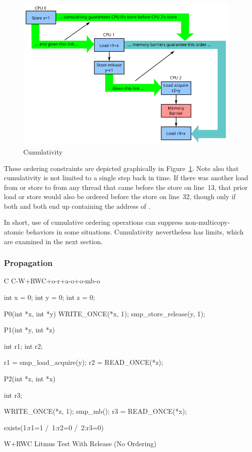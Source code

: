 \begin{figure}[htbp]
\centering
\includegraphics{memorder/memorybarriercum}
\caption{Cumulativity}
\label{fig:memorder:Cumulativity}
\end{figure}

These ordering constraints are depicted graphically in
Figure~\ref{fig:memorder:Cumulativity}.
Note also that cumulativity is not limited to a single step back in time.
If there was another load from  or store to  from any thread
that came before the store on line~13, that prior load or store would also
be ordered before the store on line~32, though only if both  and
 both end up containing the address of .

In short, use of cumulative ordering operations can suppress
non-multicopy-atomic behaviors in some situations.
Cumulativity nevertheless has limits, which are examined in the next section.

\subsubsection{Propagation}
\label{sec:memorder:Propagation}

\begin{listing}[tbp]
{ \scriptsize
\begin{verbbox}[\LstLineNo]
C C-W+RWC+o-r+a-o+o-mb-o

{
int x = 0;
int y = 0;
int z = 0;
}

P0(int *x, int *y)
{
  WRITE_ONCE(*x, 1);
  smp_store_release(y, 1);
}

P1(int *y, int *z)
{
  int r1;
  int r2;

  r1 = smp_load_acquire(y);
  r2 = READ_ONCE(*z);
}

P2(int *z, int *x)
{
  int r3;

  WRITE_ONCE(*z, 1);
  smp_mb();
  r3 = READ_ONCE(*x);
}

exists(1:r1=1 /\ 1:r2=0 /\ 2:r3=0)
\end{verbbox}
}
\centering
\theverbbox
\caption{W+RWC Litmus Test With Release (No Ordering)}
\label{lst:memorder:W+RWC Litmus Test With Release (No Ordering)}
\end{listing}

